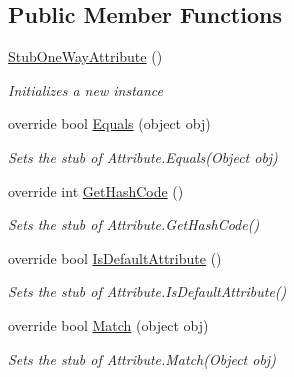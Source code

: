 \subsection*{Public Member Functions}
\begin{DoxyCompactItemize}
\item 
\hyperlink{class_system_1_1_runtime_1_1_remoting_1_1_messaging_1_1_fakes_1_1_stub_one_way_attribute_a67a53b269ff27333b1a1aa96ea672fff}{Stub\-One\-Way\-Attribute} ()
\begin{DoxyCompactList}\small\item\em Initializes a new instance\end{DoxyCompactList}\item 
override bool \hyperlink{class_system_1_1_runtime_1_1_remoting_1_1_messaging_1_1_fakes_1_1_stub_one_way_attribute_a17787c0774d2221cc297b1efbc6a0b5f}{Equals} (object obj)
\begin{DoxyCompactList}\small\item\em Sets the stub of Attribute.\-Equals(\-Object obj)\end{DoxyCompactList}\item 
override int \hyperlink{class_system_1_1_runtime_1_1_remoting_1_1_messaging_1_1_fakes_1_1_stub_one_way_attribute_ae0c581f849da003ba58aea931a23589f}{Get\-Hash\-Code} ()
\begin{DoxyCompactList}\small\item\em Sets the stub of Attribute.\-Get\-Hash\-Code()\end{DoxyCompactList}\item 
override bool \hyperlink{class_system_1_1_runtime_1_1_remoting_1_1_messaging_1_1_fakes_1_1_stub_one_way_attribute_acb769b8fafd2b3260e64857feb024f3d}{Is\-Default\-Attribute} ()
\begin{DoxyCompactList}\small\item\em Sets the stub of Attribute.\-Is\-Default\-Attribute()\end{DoxyCompactList}\item 
override bool \hyperlink{class_system_1_1_runtime_1_1_remoting_1_1_messaging_1_1_fakes_1_1_stub_one_way_attribute_a83438c1511c956c7bac3000746d97750}{Match} (object obj)
\begin{DoxyCompactList}\small\item\em Sets the stub of Attribute.\-Match(\-Object obj)\end{DoxyCompactList}\end{DoxyCompactItemize}

